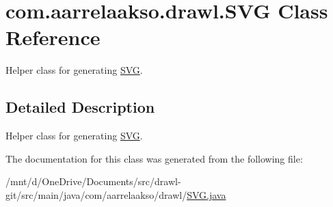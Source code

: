 \hypertarget{classcom_1_1aarrelaakso_1_1drawl_1_1_s_v_g}{}\section{com.\+aarrelaakso.\+drawl.\+S\+VG Class Reference}
\label{classcom_1_1aarrelaakso_1_1drawl_1_1_s_v_g}


Helper class for generating \hyperlink{classcom_1_1aarrelaakso_1_1drawl_1_1_s_v_g}{S\+VG}.  




\subsection{Detailed Description}
Helper class for generating \hyperlink{classcom_1_1aarrelaakso_1_1drawl_1_1_s_v_g}{S\+VG}. 

The documentation for this class was generated from the following file\+:\begin{DoxyCompactItemize}
\item 
/mnt/d/\+One\+Drive/\+Documents/src/drawl-\/git/src/main/java/com/aarrelaakso/drawl/\hyperlink{_s_v_g_8java}{S\+V\+G.\+java}\end{DoxyCompactItemize}
